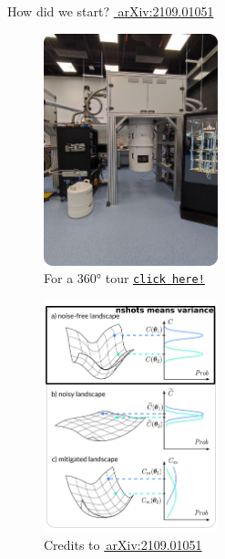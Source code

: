 \documentclass[8pt, xcolor={svgnames}, hyperref={linkcolor=black}]{beamer}
\begin{document}
\begin{frame}{How did we start? \hfill \href{https://arxiv.org/abs/2109.01051}{\faBook\,\,arXiv:2109.01051}}
\begin{multicols}{2}
\begin{figure}
\includegraphics[width=0.45\textwidth, height=0.8\textheight]{figures/tii_lab.png}
\caption*{For a 360° tour \href{https://files-prod.tii.ae/360/TII-QRC-Computing-Lab.html}{\texttt{click here!}}}
\end{figure}
\begin{figure}
\includegraphics[width=0.45\textwidth, height=0.8\textheight]{figures/NIBP_1.png}
\caption*{Credits to \href{https://arxiv.org/abs/2109.01051}{\faBook\,arXiv:2109.01051}}
\end{figure}
\end{multicols}
\end{frame}
\end{document}

